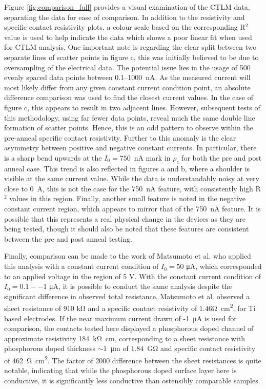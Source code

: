 \begin{refsection}
Figure \ref{fig:comparison_full} provides a visual examination of the CTLM data, separating the data for ease of comparison. In addition to the resistivity and specific contact resistivity plots, a colour scale based on the corresponding R$^{2}$ value is used to help indicate the data which shows a poor linear fit when used for CTLM analysis. One important note is regarding the clear split between two separate lines of scatter points in figure c, this was initially believed to be due to oversampling of the electrical data. The potential issue lies in the usage of 500 evenly spaced data points between 0.1--1000~\si{\nano\ampere}. As the measured current will most likely differ from any given constant current condition point, an absolute difference comparison was used to find the closest current values. In the case of figure c, this appears to result in two adjacent lines. However, subsequent tests of this methodology, using far fewer data points, reveal much the same double line formation of scatter points. Hence, this is an odd pattern to observe within the pre-anneal specific contact resistivity. Further to this anomaly is the clear asymmetry between positive and negative constant currents. In particular, there is a sharp bend upwards at the $I_{0}=750$~\si{\nano\ampere} mark in $\rho_{c}$ for both the pre and post anneal case. This trend is also reflected in figures a and b, where a shoulder is visible at the same current value. While the data is understandably noisy at very close to 0~\si{\ampere}, this is not the case for the 750~\si{\nano\ampere} feature, with consistently high R$^{2}$ values in this region. Finally, another small feature is noted in the negative constant current region, which appears to mirror that of the 750~\si{\nano\ampere} feature. It is possible that this represents a real physical change in the devices as they are being tested, though it should also be noted that these features are consistent between the pre and post anneal testing. 

Finally, comparison can be made to the work of Matsumoto et al. \cite{matsumoto2013} who applied this analysis with a constant current condition of $I_{0} = 50$ \si{\micro\ampere}, which corresponded to an applied voltage in the region of 5 \si{\volt}. With the constant current condition of $I_{0} = 0.1--1$ \si{\micro\ampere}, it is possible to conduct the same analysis despite the significant difference in observed total resistance. Matsumoto et al. observed a sheet resistance of $910$ \si{\kilo\ohm} and a specific contact resistivity of $1.46$\si{\ohm\centi\metre\squared}, for Ti based electrodes. If the near maximum current drawn of -1~\si{\micro\ampere} is used for comparison, the contacts tested here displayed a phosphorous doped channel of approximate resistivity 184~\si{\kilo\ohm\centi\metre}, corresponding to a sheet resistance with phosphorous doped thickness $\sim1$~\si{\micro\metre} of $1.84$~\si{\giga\ohm} and specific contact resistivity of 462~\si{\ohm\centi\metre\squared}. The factor of 2000 difference between the sheet resistances is quite notable, indicating that while the phosphorous doped surface layer here is conductive, it is significantly less conductive than ostensibly comparable samples. 


\end{refsection}
